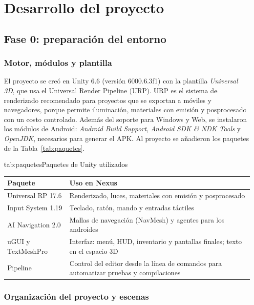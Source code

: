 \section{Desarrollo del proyecto}

\subsection{Fase 0: preparación del entorno}

\subsubsection{Motor, módulos y plantilla}

El proyecto se creó en Unity 6.6 (versión 6000.6.3f1) con la plantilla \textit{Universal 3D}, que
usa el Universal Render Pipeline (URP). URP es el sistema de renderizado recomendado para proyectos
que se exportan a móviles y navegadores, porque permite iluminación, materiales con emisión y
posprocesado con un costo controlado. Además del soporte para Windows y Web, se instalaron los
módulos de Android: \textit{Android Build Support}, \textit{Android SDK \& NDK Tools} y
\textit{OpenJDK}, necesarios para generar el APK. Al proyecto se añadieron los paquetes de la
Tabla~\ref{tab:paquetes}.

\begin{TablaAPA}{tab:paquetes}{Paquetes de Unity utilizados}
\begin{tabularx}{\linewidth}{P{4.2cm}L}
\toprule
Paquete & Uso en Nexus \\
\midrule
Universal RP 17.6 & Renderizado, luces, materiales con emisión y posprocesado \\
Input System 1.19 & Teclado, ratón, mando y entradas táctiles \\
AI Navigation 2.0 & Mallas de navegación (NavMesh) y agentes para los androides \\
uGUI y TextMeshPro & Interfaz: menú, HUD, inventario y pantallas finales; texto en el espacio 3D \\
Pipeline & Control del editor desde la línea de comandos para automatizar pruebas y compilaciones \\
\bottomrule
\end{tabularx}
\end{TablaAPA}

\subsubsection{Organización del proyecto y escenas}

